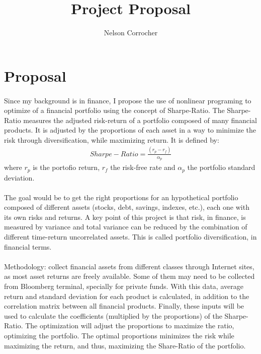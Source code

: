 \documentclass[]{article}
\title{Project Proposal}
\author{Nelson Corrocher}
\begin{document}
\maketitle

\clearpage

\section{Proposal}
\paragraph{}Since my background is in finance, I propose the use of nonlinear programing to optimize of a financial portfolio using the concept of Sharpe-Ratio. The Sharpe-Ratio measures the adjusted risk-return of a portfolio composed of many financial products. It is adjusted by the proportions of each asset in a way to minimize the risk through diversification, while maximizing return. It is defined by:\\
\begin{align*}
Sharpe-Ratio = \frac{(r_p - r_f)}{\alpha_p}
\end{align*}
where $r_p$ is the portofio return, $r_f$ the risk-free rate and $\alpha_p$ the portfolio standard deviation.
\paragraph{}The goal would be to get the right proportions for an hypothetical portfolio composed of different assets (stocks, debt, savings, indexes, etc.), each one with its own risks and returns. A key point of this project is that risk, in finance, is measured by variance and total variance can be reduced by the combination of different time-return uncorrelated assets. This is called portfolio diversification, in financial terms. \\
\paragraph{}Methodology: collect financial assets from different classes through Internet sites, as most asset returns are freely available. Some of them may need to be collected from Bloomberg terminal, specially for private funds. With this data, average return and standard deviation for each product is calculated, in addition to the correlation matrix between all financial products. Finally, these inputs will be used to calculate the coefficients (multiplied by the proportions) of the Sharpe-Ratio. The optimization will adjust the proportions to maximize the ratio, optimizing the portfolio.
The optimal proportions minimizes the risk while maximizing the return, and thus, maximizing the Share-Ratio of the portfolio. \\
\end{document}
